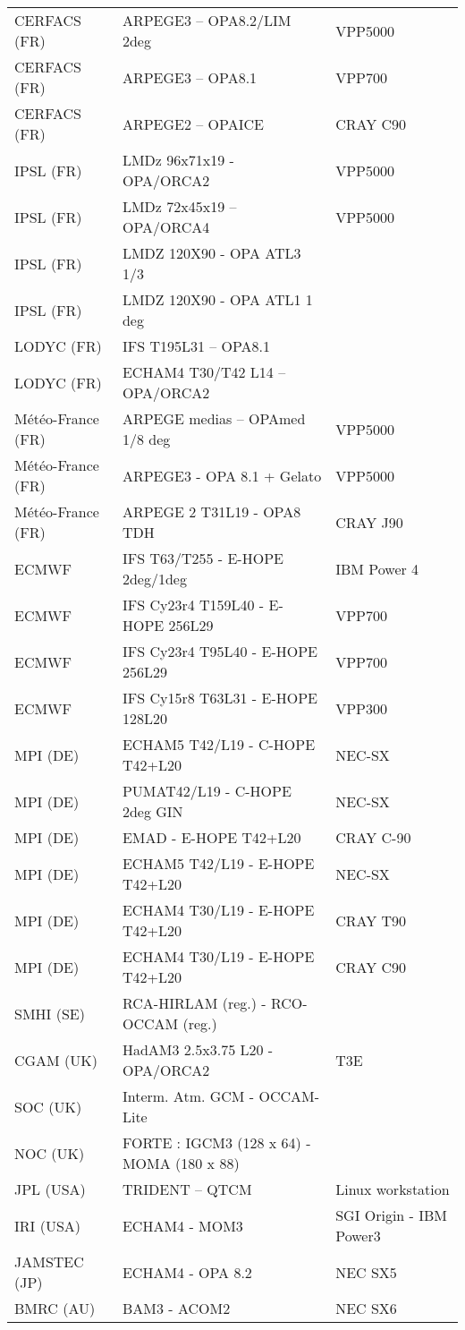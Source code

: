 \begin{center}
\begin{longtable}{|l|l|l|}
CERFACS (FR) &	ARPEGE3 – OPA8.2/LIM 2deg &				VPP5000 \\
CERFACS (FR) &	ARPEGE3 – OPA8.1 &					VPP700 \\
CERFACS (FR) &	ARPEGE2 – OPAICE &					CRAY C90 \\ 
IPSL (FR) &	LMDz 96x71x19  - OPA/ORCA2  &	VPP5000 \\
IPSL (FR) &	LMDz 72x45x19 – OPA/ORCA4  	&	VPP5000 \\
IPSL (FR) &	LMDZ 120X90 - OPA ATL3 1/3 & \\
IPSL (FR) &	LMDZ 120X90 - OPA ATL1 1 deg & \\
LODYC (FR) &	IFS T195L31 – OPA8.1 & \\
LODYC (FR) &	ECHAM4 T30/T42 L14 – OPA/ORCA2 & \\
M\'et\'eo-France (FR) &	ARPEGE medias – OPAmed 1/8 deg	 &		VPP5000 \\
M\'et\'eo-France (FR) &	ARPEGE3 - OPA 8.1 + Gelato &				VPP5000 \\
M\'et\'eo-France (FR) &	ARPEGE 2 T31L19 - OPA8 TDH &	        		CRAY J90 \\
ECMWF &	IFS T63/T255  - E-HOPE 2deg/1deg  &			IBM Power 4 \\
ECMWF &	IFS Cy23r4 T159L40 - E-HOPE 256L29 &		VPP700 \\
ECMWF &	IFS Cy23r4 T95L40  - E-HOPE 256L29 &			VPP700 \\
ECMWF &	IFS Cy15r8 T63L31  - E-HOPE 128L20 &	 		VPP300 \\
MPI (DE) &	ECHAM5 T42/L19 - C-HOPE T42+L20 &		NEC-SX \\
MPI (DE) &	PUMAT42/L19 - C-HOPE 2deg GIN	&		NEC-SX \\
MPI (DE) &	EMAD - E-HOPE T42+L20	 	&		CRAY C-90 \\
MPI (DE) &	ECHAM5 T42/L19 - E-HOPE T42+L20 &			NEC-SX \\
MPI (DE) &	ECHAM4 T30/L19 - E-HOPE T42+L20	&		CRAY T90 \\
MPI (DE) &	ECHAM4 T30/L19 - E-HOPE T42+L20 &			CRAY C90 \\
SMHI (SE) &	RCA-HIRLAM (reg.) - RCO-OCCAM (reg.) & \\
CGAM (UK) &	HadAM3 2.5x3.75 L20 - OPA/ORCA2   &  		T3E \\
SOC (UK) & 	Interm. Atm. GCM - OCCAM-Lite & \\
NOC (UK) &	FORTE : IGCM3 (128 x 64) - MOMA (180 x 88) & \\
JPL (USA) &	TRIDENT – QTCM	 &				Linux workstation \\	
IRI  (USA) &	ECHAM4 - MOM3	& 				SGI Origin - IBM Power3 \\
JAMSTEC (JP) &	ECHAM4 - OPA 8.2 &	  				NEC SX5 \\
BMRC (AU) &    BAM3 - ACOM2 &			NEC SX6 \\

\end{longtable}
\end{center}


